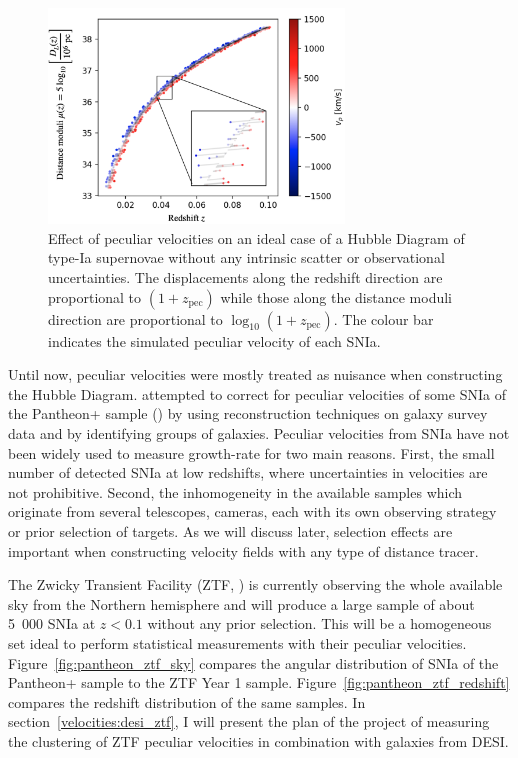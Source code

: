     \begin{figure}[t]
        \centering 
        \includegraphics[width=0.7\textwidth]{fig/velocities/pv_hubble_diagram_snia.png}
        \caption{Effect of peculiar velocities on an ideal case of a Hubble Diagram of 
        type-Ia supernovae without any intrinsic scatter or observational uncertainties.
        The displacements along the redshift direction are proportional to $(1+z_\text{pec})$
        while those along the distance moduli direction are proportional to $\log_{10}(1+z_\text{pec})$.
        The colour bar indicates the simulated peculiar velocity of each SNIa. }
        \label{fig:pv_hubble_diagram_snia}
    \end{figure}

    Until now, peculiar velocities were mostly treated as nuisance when 
    constructing the Hubble Diagram. 
    \cite{petersonPantheonAnalysisEvaluating2021} 
    attempted to correct for peculiar velocities of some SNIa of the Pantheon+ sample 
    (\cite{scolnicPantheonAnalysisFull2022}) by using reconstruction techniques on 
    galaxy survey data and by identifying groups of galaxies. 
    Peculiar velocities from SNIa have not been widely used to measure growth-rate for two main 
    reasons. First, the small number of detected SNIa at low redshifts, where uncertainties in 
    velocities are not prohibitive. Second, the inhomogeneity in the available samples which 
    originate from several telescopes, cameras, each with its own observing strategy or 
    prior selection of targets. As we will discuss later, selection effects are important 
    when constructing velocity fields with any type of distance tracer. 
    
    The Zwicky Transient Facility (ZTF, \cite{grahamZwickyTransientFacility2019}) 
    is currently observing the whole available sky from the Northern 
    hemisphere and will produce a large sample of about 5~000 SNIa at $z<0.1$ without any prior 
    selection. This will be a homogeneous set ideal to perform statistical measurements with their 
    peculiar velocities.
    Figure~\ref{fig:pantheon_ztf_sky} compares the angular distribution of SNIa of the Pantheon+ sample 
    to the ZTF Year 1 sample.  
    Figure~\ref{fig:pantheon_ztf_redshift} compares the redshift distribution of the same samples. 
    In section~\ref{velocities:desi_ztf}, I will present the plan of the project of measuring 
    the clustering of ZTF peculiar velocities in combination with galaxies from DESI. 
    
